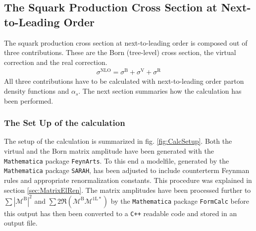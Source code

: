 \subsection{The Squark Production Cross Section at Next-to-Leading Order}
The squark production cross section at next-to-leading order is composed out of three contributions. These are the Born (tree-level) cross section, the virtual correction and the real correction. 
\begin{align}
\sigma^{\mathrm{NLO}} = \sigma^{\mathrm{B}} + \sigma^{\mathrm{V}} + \sigma^{\mathrm{R}}\label{eq:BVR}
\end{align}
All three contributions have to be calculated with next-to-leading order parton density functions and $\alpha_s$. The next section summaries how the calculation has been performed.

\subsubsection{The Set Up of the calculation}
The setup of the calculation is summarized in fig. \ref{fig:CalcSetup}. Both the virtual and the Born matrix amplitude have been generated with the \texttt{Mathematica} package \texttt{FeynArts}. To this end a modelfile, generated by the \texttt{Mathematica} package \texttt{SARAH}, has been adjusted to include counterterm Feynman rules and appropriate renormalization constants. This procedure was explained in section \ref{sec:MatrixElRen}. The matrix amplitudes have been processed further to $\sum|\mathcal{M}^{\mathrm{B}}|^2$ and $ \sum 2\Re (\mathcal{M}^{\mathrm{B}} \mathcal{M}^{\mathrm{1L}\ast})$ by the \texttt{Mathematica} package \texttt{FormCalc} before this output has then been converted to a \texttt{C++} readable code and stored in an output file.
